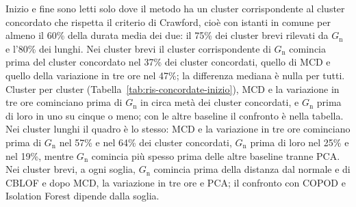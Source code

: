 Inizio e fine sono letti solo dove il metodo ha un cluster corrispondente al cluster concordato che rispetta il criterio di Crawford, cioè con istanti in comune per almeno il 60\% della durata media dei due: il 75\% dei cluster brevi rilevati da $G_{\mathrm{n}}$ e l'80\% dei lunghi. Nei cluster brevi il cluster corrispondente di $G_{\mathrm{n}}$ comincia prima del cluster concordato nel 37\% dei cluster concordati, quello di MCD e quello della variazione in tre ore nel 47\%; la differenza mediana è nulla per tutti. Cluster per cluster (Tabella~\ref{tab:ris-concordate-inizio}), MCD e la variazione in tre ore cominciano prima di $G_{\mathrm{n}}$ in circa metà dei cluster concordati, e $G_{\mathrm{n}}$ prima di loro in uno su cinque o meno; con le altre baseline il confronto è nella tabella. Nei cluster lunghi il quadro è lo stesso: MCD e la variazione in tre ore cominciano prima di $G_{\mathrm{n}}$ nel 57\% e nel 64\% dei cluster concordati, $G_{\mathrm{n}}$ prima di loro nel 25\% e nel 19\%, mentre $G_{\mathrm{n}}$ comincia più spesso prima delle altre baseline tranne PCA. Nei cluster brevi, a ogni soglia, $G_{\mathrm{n}}$ comincia prima della distanza dal normale e di CBLOF e dopo MCD, la variazione in tre ore e PCA; il confronto con COPOD e Isolation Forest dipende dalla soglia.


